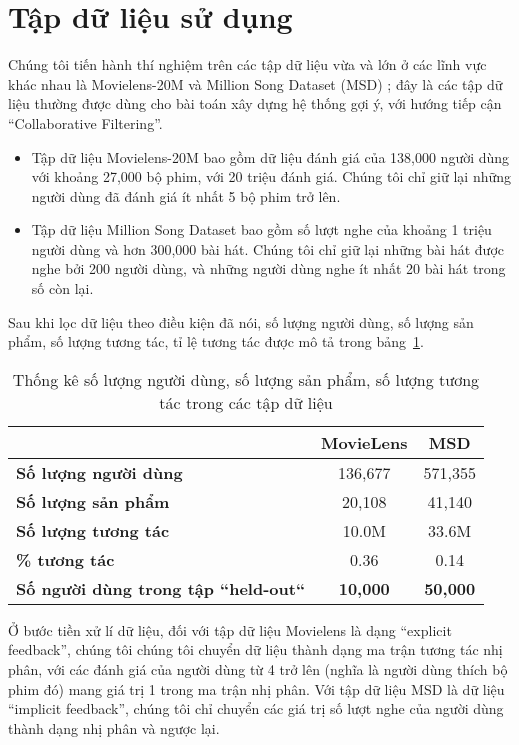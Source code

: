 \section{Tập dữ liệu sử dụng}
Chúng tôi tiến hành thí nghiệm trên các tập dữ liệu vừa và lớn ở các lĩnh vực khác nhau là Movielens-20M \cite{Ml20M} 
và Million Song Dataset (MSD) \cite{MSD}; đây là các tập dữ liệu thường được dùng cho bài toán xây dựng hệ thống gợi ý,
với hướng tiếp cận ``Collaborative Filtering''.
\begin{itemize}
    \item Tập dữ liệu Movielens-20M bao gồm dữ liệu đánh giá của 138,000 người dùng với khoảng 27,000 bộ phim,
    với 20 triệu đánh giá. Chúng tôi chỉ giữ lại những người dùng đã đánh giá ít nhất 5 bộ phim trở lên. 
    \item Tập dữ liệu Million Song Dataset bao gồm số lượt nghe của khoảng 1 triệu người dùng và hơn 300,000 bài hát.
    Chúng tôi chỉ giữ lại những bài hát được nghe bởi 200 người dùng, và những người dùng nghe ít nhất 20 bài hát trong số còn lại.
\end{itemize}
Sau khi lọc dữ liệu theo điều kiện đã nói, số lượng người dùng, số lượng sản phẩm, số lượng tương tác, tỉ lệ tương tác được mô tả trong bảng~\ref{table_dataset}.
\begin{table}[]
\centering
    \begin{tabular}{|l|c|c|}
    \hline
                                                & \textbf{MovieLens} & \textbf{MSD}    \\ \hline
    \textbf{Số lượng người dùng}                  & 136,677            & 571,355         \\ \hline
    \textbf{Số lượng sản phẩm}                    & 20,108             & 41,140          \\ \hline
    \textbf{Số lượng tương tác}                   & 10.0M              & 33.6M           \\ \hline
    \textbf{\% tương tác}                         & 0.36               & 0.14            \\ \hline
    \textbf{Số người dùng trong tập ``held-out``} & \textbf{10,000}    & \textbf{50,000} \\ \hline
    \end{tabular}
    \label{table_dataset}
    \caption{Thống kê số lượng người dùng, số lượng sản phẩm, số lượng tương tác trong các tập dữ liệu}    
\end{table}


Ở bước tiền xử lí dữ liệu, đối với tập dữ liệu Movielens là dạng ``explicit feedback'', chúng tôi 
chúng tôi chuyển dữ liệu thành dạng ma trận tương tác nhị phân, với các đánh giá của người dùng từ 4 trở lên (nghĩa là người dùng thích bộ phim đó) mang giá trị 1 trong ma trận nhị phân.
Với tập dữ liệu MSD là dữ liệu ``implicit feedback'', chúng tôi chỉ chuyển các giá trị số lượt nghe của người dùng thành dạng nhị phân và ngược lại.

